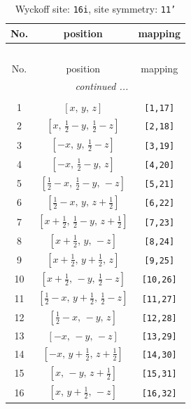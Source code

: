 \documentclass[fleqn,8pt]{jsarticle}
\begin{document}
\begin{longtable}{ccc}
\caption{Wyckoff site: {\tt 16i}, site symmetry: {\tt 11'}}
 \\
 \hline \hline
No. & position & mapping \\ \hline \endfirsthead

\multicolumn{2}{l}{\tablename\ \thetable{}} \\
 \hline \hline
No. & position & mapping \\ \hline \endhead

 \hline \hline
\multicolumn{2}{r}{\footnotesize\it continued ...} \\ \endfoot

 \hline \hline
\multicolumn{2}{r}{} \\ \endlastfoot

1 & $\left[ x,\, y,\, z \right]$ & {\tt [1,17]} \\ \hline
2 & $\left[ x,\, \frac{1}{2} - y,\, \frac{1}{2} - z \right]$ & {\tt [2,18]} \\ \hline
3 & $\left[ - x,\, y,\, \frac{1}{2} - z \right]$ & {\tt [3,19]} \\ \hline
4 & $\left[ - x,\, \frac{1}{2} - y,\, z \right]$ & {\tt [4,20]} \\ \hline
5 & $\left[ \frac{1}{2} - x,\, \frac{1}{2} - y,\, - z \right]$ & {\tt [5,21]} \\ \hline
6 & $\left[ \frac{1}{2} - x,\, y,\, z + \frac{1}{2} \right]$ & {\tt [6,22]} \\ \hline
7 & $\left[ x + \frac{1}{2},\, \frac{1}{2} - y,\, z + \frac{1}{2} \right]$ & {\tt [7,23]} \\ \hline
8 & $\left[ x + \frac{1}{2},\, y,\, - z \right]$ & {\tt [8,24]} \\ \hline
9 & $\left[ x + \frac{1}{2},\, y + \frac{1}{2},\, z \right]$ & {\tt [9,25]} \\ \hline
10 & $\left[ x + \frac{1}{2},\, - y,\, \frac{1}{2} - z \right]$ & {\tt [10,26]} \\ \hline
11 & $\left[ \frac{1}{2} - x,\, y + \frac{1}{2},\, \frac{1}{2} - z \right]$ & {\tt [11,27]} \\ \hline
12 & $\left[ \frac{1}{2} - x,\, - y,\, z \right]$ & {\tt [12,28]} \\ \hline
13 & $\left[ - x,\, - y,\, - z \right]$ & {\tt [13,29]} \\ \hline
14 & $\left[ - x,\, y + \frac{1}{2},\, z + \frac{1}{2} \right]$ & {\tt [14,30]} \\ \hline
15 & $\left[ x,\, - y,\, z + \frac{1}{2} \right]$ & {\tt [15,31]} \\ \hline
16 & $\left[ x,\, y + \frac{1}{2},\, - z \right]$ & {\tt [16,32]} \\
\end{longtable}
\end{document}
